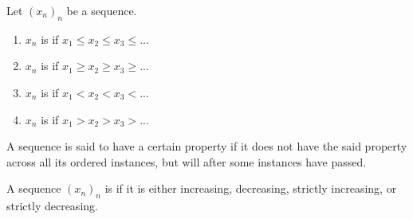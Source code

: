     \begin{definition}
        Let $(x_n)_n$ be a sequence.
            \begin{enumerate}[label = (\arabic*)]
                \item $x_n$ is  if $x_1 \leq x_2 \leq x_3 \leq ...$
                \item $x_n$ is  if $x_1 \geq x_2 \geq x_3 \geq ...$
                \item $x_n$ is  if $x_1 < x_2 < x_3 < ...$
                \item $x_n$ is  if $x_1 > x_2 > x_3 > ...$
            \end{enumerate}
    \end{definition}

    \begin{definition}
        A sequence is said to  have a certain property if it does not have the said property across all its ordered instances, but will after some instances have passed.
    \end{definition}

    \begin{definition}
        A sequence $(x_n)_n$ is  if it is either increasing, decreasing, strictly increasing, or strictly decreasing.
    \end{definition}

